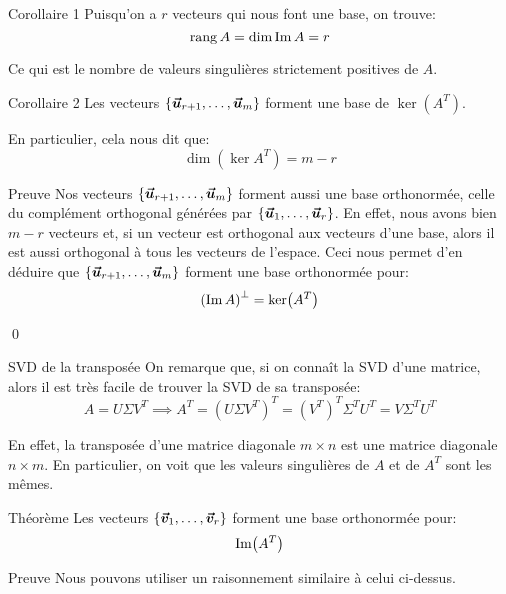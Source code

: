 \documentclass[a4paper]{article}
\begin{document}
\begin{parag}{Corollaire 1}
    Puisqu'on a $r$ vecteurs qui nous font une base, on trouve: 
    \[\operatorname{rang} A = \dim\operatorname{Im} A = r\]

    Ce qui est le nombre de valeurs singulières strictement positives de $A$.
\end{parag}

\begin{parag}{Corollaire 2}
    Les vecteurs $\left\{\bvec{u}_{r+1}, \ldots, \bvec{u}_{m}\right\}$ forment une base de $\ker\left(A^T\right)$.

    En particulier, cela nous dit que: 
    \[\dim\left(\ker A^T\right) = m - r\]

    \begin{subparag}{Preuve}
        Nos vecteurs $\left\{\bvec{u}_{r+1}, \ldots, \bvec{u}_m\right\}$ forment aussi une base orthonormée, celle du complément orthogonal générées par $\left\{\bvec{u}_1, \ldots, \bvec{u}_r\right\}$. En effet, nous avons bien $m - r$ vecteurs et, si un vecteur est orthogonal aux vecteurs d'une base, alors il est aussi orthogonal à tous les vecteurs de l'espace. Ceci nous permet d'en déduire que $\left\{\bvec{u}_{r+1}, \ldots, \bvec{u}_m\right\}$ forment une base orthonormée pour: 
        \[\left(\im A\right)^\perp = \ker\left(A^T\right)\]

        \qed
    \end{subparag}
\end{parag}

\begin{parag}{SVD de la transposée}
    On remarque que, si on connaît la SVD d'une matrice, alors il est très facile de trouver la SVD de sa transposée: 
    \[A = U \Sigma V^T \implies A^T = \left(U \Sigma V^T\right)^T = \left(V^T\right)^T \Sigma^T U^T = V \Sigma^T U^T\]
    
    En effet, la transposée d'une matrice diagonale $m \times n$ est une matrice diagonale $n \times m$. En particulier, on voit que les valeurs singulières de $A$ et de $A^T$ sont les mêmes.
\end{parag}

\begin{parag}{Théorème}
    Les vecteurs $\left\{\bvec{v}_1, \ldots, \bvec{v}_r\right\}$ forment une base orthonormée pour:
    \[\im\left(A^T\right)\]

    \begin{subparag}{Preuve}
        Nous pouvons utiliser un raisonnement similaire à celui ci-dessus.
    \end{subparag}
    
\end{parag}
\end{document}
